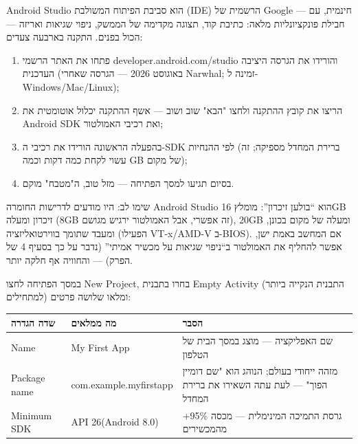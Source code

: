 


Android Studio הוא סביבת הפיתוח המשולבת (IDE) הרשמית של Google — חינמית, עם חבילת פונקציונליות מלאה: כתיבת קוד, תצוגה מקדימה של הממשק, ניפוי שגיאות ואריזה — הכול בפנים. התקנה בארבעה צעדים:

\begin{enumerate}
  \item פתחו את האתר הרשמי developer.android.com/studio והורידו את הגרסה היציבה העדכנית (באוגוסט 2026 — הגרסה שאחרי Narwhal; זמינה ל-Windows/Mac/Linux);
  \item הריצו את קובץ ההתקנה ולחצו "הבא" שוב ושוב — אשף ההתקנה יכלול אוטומטית את Android SDK ואת רכיבי האמולטור;
  \item בהפעלה הראשונה הורידו את רכיבי ה-SDK לפי ההנחיות (ברירת המחדל מספיקה; זה עשוי לקחת כמה דקות וכמה GB של מקום);
  \item בסיום תגיעו למסך הפתיחה — מזל טוב, ה"מטבח" מוקם.
\end{enumerate}

\begin{tcbwarn}{שימו לב: היו מודעים לדרישות החומרה}
Android Studio הוא “בולען זיכרון”: מומלץ 16GB זיכרון ומעלה (8GB זה אפשרי, אבל האמולטור ירגיש מגושם), 20GB ומעלה של מקום בכונן, ומעבד שתומך בווירטואליזציה (הפעילו VT-x/AMD-V ב-BIOS). אם המחשב באמת ישן, אפשר להחליף את האמולטור ב“ניפוי שגיאות על מכשיר אמיתי” (נדבר על כך בסעיף 4 של הפרק) — והחוויה אף חלקה יותר.

\end{tcbwarn}


במסך הפתיחה לחצו New Project, בחרו בתבנית Empty Activity (התבנית הנקייה ביותר למתחילים) ומלאו שלושה פרטים:

\begin{center}
\begin{tabularx}{\linewidth}{|X|X|X|}
\hline
\textbf{שדה הגדרה} & \textbf{מה ממלאים} & \textbf{הסבר} \tabularnewline
\hline
Name & My First App & שם האפליקציה — מוצג במסך הבית של הטלפון \tabularnewline
Package name & com.example.myfirstapp & מזהה ייחודי בעולם; הנוהג הוא "שם דומיין הפוך" — לעת עתה השאירו את ברירת המחדל \tabularnewline
Minimum SDK & API 26(Android 8.0) & גרסת התמיכה המינימלית — מכסה 95\%+ מהמכשירים \tabularnewline
\hline
\end{tabularx}
\end{center}

